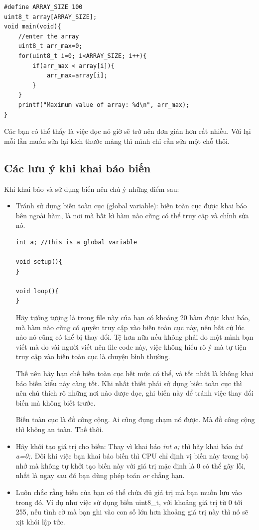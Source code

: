 \begin{lstlisting}
#define ARRAY_SIZE 100
uint8_t array[ARRAY_SIZE];
void main(void){
	//enter the array
	uint8_t arr_max=0;
	for(uint8_t i=0; i<ARRAY_SIZE; i++){
		if(arr_max < array[i]){
			arr_max=array[i];
		}
	}
	printf("Maximum value of array: %d\n", arr_max);
}

\end{lstlisting}

Các bạn có thể thấy là việc đọc nó giờ sẽ trở nên đơn giản hơn rất nhiều. Với lại mỗi lần muốn sửa lại kích thước mảng thì mình chỉ cần sửa một chỗ thôi.
\subsection{Các lưu ý khi khai báo biến}

Khi khai báo và sử dụng biến nên chú ý những điểm sau:
\begin{itemize}
\item Tránh sử dụng biến toàn cục (global variable): biến toàn cục được khai báo bên ngoài hàm, là nơi mà bất kì hàm nào cũng có thể truy cập và chỉnh sửa nó. 
\begin{lstlisting}
int a; //this is a global variable

void setup(){
}

void loop(){
}
\end{lstlisting}

Hãy tưởng tượng là trong file này của bạn có khoảng 20 hàm được khai báo, mà hàm nào cũng có quyền truy cập vào biến toàn cục này, nên bất cứ lúc nào nó cũng có thể bị thay đổi. Tệ hơn nữa nếu không phải do một mình bạn viết mà do vài người viết nên file code này, việc không hiểu rõ ý mà tự tiện truy cập vào biến toàn cục là chuyện bình thường.

Thế nên hãy hạn chế biến toàn cục hết mức có thể, và tốt nhất là không khai báo biến kiểu này càng tốt. Khi nhất thiết phải sử dụng biến toàn cục thì nên chú thích rõ những nơi nào được đọc, ghi biến này để tránh việc thay đổi biến mà không biết trước.

Biến toàn cục là đồ công cộng. Ai cũng đụng chạm nó được. Mà đồ công cộng thì không an toàn. Thế thôi.
\item Hãy khởi tạo giá trị cho biến: Thay vì khai báo \textit{int a;} thì hãy khai báo \textit{int a=0;}. Đôi khi việc bạn khai báo biến thì CPU chỉ định vị biến này trong bộ nhớ mà không tự khởi tạo biến này với giá trị mặc định là 0 có thể gây lỗi, nhất là ngay sau đó bạn dùng phép toán \textit{or} chẳng hạn.
\item Luôn chắc rằng biến của bạn có thể chứa đủ giá trị mà bạn muốn lưu vào trong đó. Ví dụ như việc sử dụng biến uint8\_t, với khoảng giá trị từ 0 tới 255, nếu tình cờ mà bạn ghi vào con số lớn hơn khoảng giá trị này thì nó sẽ xịt khói lập tức.
\end{itemize}
